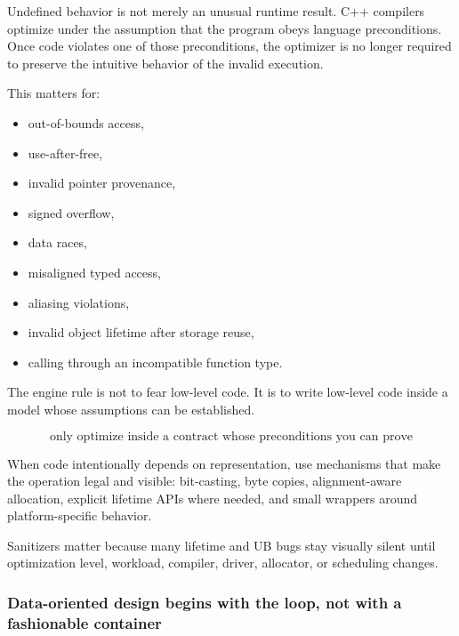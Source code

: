 \hypertarget{01-foundations-i-ch005-undefined-behavior-removes-assumptions-under-which-optimization-is-reasoned-about}{}

Undefined behavior is not merely an unusual runtime result. C++ compilers optimize under the assumption that the program obeys language preconditions. Once code violates one of those preconditions, the optimizer is no longer required to preserve the intuitive behavior of the invalid execution.

This matters for:

\begin{itemize}
\tightlist
\item
  out-of-bounds access,
\item
  use-after-free,
\item
  invalid pointer provenance,
\item
  signed overflow,
\item
  data races,
\item
  misaligned typed access,
\item
  aliasing violations,
\item
  invalid object lifetime after storage reuse,
\item
  calling through an incompatible function type.
\end{itemize}

The engine rule is not to fear low-level code. It is to write low-level code inside a model whose assumptions can be established.

\[
\boxed{
\text{only optimize inside a contract whose preconditions you can prove}
}
\]

When code intentionally depends on representation, use mechanisms that make the operation legal and visible: bit-casting, byte copies, alignment-aware allocation, explicit lifetime APIs where needed, and small wrappers around platform-specific behavior.

Sanitizers matter because many lifetime and UB bugs stay visually silent until optimization level, workload, compiler, driver, allocator, or scheduling changes.

\subsubsection{Data-oriented design begins with the loop, not with a fashionable container}\label{01-foundations-i-ch005-data-oriented-design-begins-with-the-loop-not-with-a-fashionable-container}

\hypertarget{01-foundations-i-ch005-data-oriented-design-begins-with-the-loop-not-with-a-fashionable-container}{}

